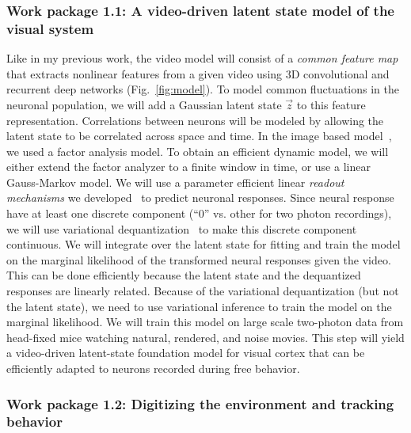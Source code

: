 \documentclass[B2,COG]{ercgrant}
\begin{document}
\subsubsection{Work package 1.1: A video-driven latent state model of the visual system\hfill{}}
Like in my previous work, the video model will consist of a \textit{common feature map} that extracts nonlinear features from a given video using 3D convolutional and recurrent deep networks (Fig.~\ref{fig:model}).
To model common fluctuations in the neuronal population, we will add a Gaussian latent state $\vec{z}$ to this feature representation.
Correlations between neurons will be modeled by allowing the latent state to be correlated across space and time. 
In the image based model~\parencite{Bashiri2021-or}, we used a factor analysis model. 
To obtain an efficient dynamic model, we will either extend the factor analyzer to a finite window in time, or use a linear Gauss-Markov model. 
We will use a parameter efficient linear \textit{readout mechanisms} we developed~\parencite{Lurz2020-ua} to predict neuronal responses.
Since neural response have at least one discrete component (``0'' vs. other for two photon recordings), we will use variational dequantization~\parencite{Hoogeboom2021-zs} to make this discrete component continuous.
We will integrate over the latent state for fitting and train the model on the marginal likelihood of the transformed neural responses given the video.
This can be done efficiently because the latent state and the dequantized responses are linearly related.
Because of the variational dequantization (but not the latent state), we need to use variational inference to train the model on the marginal likelihood. 
We will train this model on large scale two-photon data from head-fixed mice watching natural, rendered, and noise movies.
This step will yield a video-driven latent-state foundation model for visual cortex that can be efficiently adapted to neurons recorded during free behavior.

\subsubsection{Work package 1.2: Digitizing the environment and tracking behavior\hfill{}}
\end{document}
